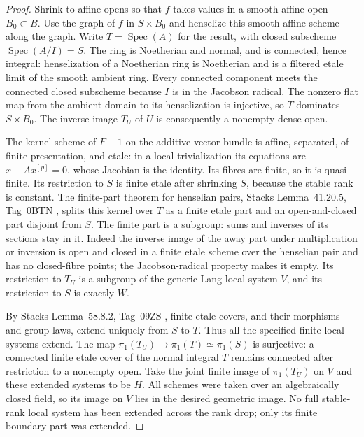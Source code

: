 \begin{proof}
Shrink to affine opens so that $f$ takes values in a smooth
affine open $B_0\subset B$.  Use the graph of $f$ in
$S\times B_0$ and henselize this smooth affine scheme along
the graph.  Write $T=\operatorname{Spec}(A)$ for the result,
with closed subscheme $\operatorname{Spec}(A/I)=S$.
The ring is Noetherian and normal, and is connected, hence integral:
henselization of a Noetherian ring is Noetherian and is a
filtered etale limit of the smooth ambient ring.  Every
connected component meets the connected closed subscheme
because $I$ is in the Jacobson radical.  The nonzero flat
map from the ambient domain to its henselization is injective,
so $T$ dominates $S\times B_0$.  The inverse image $T_U$
of $U$ is consequently a nonempty dense open.

The kernel scheme of $F-1$ on the additive vector bundle
is affine, separated, of finite presentation, and etale:
in a local trivialization its equations are
$x-Ax^{[p]}=0$, whose Jacobian is the identity.
Its fibres are finite, so it is quasi-finite.
Its restriction to $S$ is finite etale after shrinking
$S$, because the stable rank is constant.
The finite-part theorem for henselian pairs,
Stacks Lemma~41.20.5, Tag~0BTN \cite{Stacks0BTN},
splits this kernel over $T$ as a finite etale part and an
open-and-closed part disjoint from $S$.
The finite part is a subgroup: sums and inverses of its
sections stay in it. Indeed the inverse image of the away part
under multiplication or inversion is open and closed in a finite
etale scheme over the henselian pair and has no closed-fibre points;
the Jacobson-radical property makes it empty. Its restriction to
$T_U$ is a subgroup of the generic Lang local system $V$,
and its restriction to $S$ is exactly $W$.

By Stacks Lemma~58.8.2, Tag~09ZS \cite{Stacks09ZS},
finite etale covers, and their morphisms and group laws,
extend uniquely from $S$ to $T$.
Thus all the specified finite local systems extend.
The map $\pi_1(T_U)\to\pi_1(T)\simeq\pi_1(S)$ is
surjective: a connected finite etale cover of the normal
integral $T$ remains connected after restriction to a
nonempty open.  Take the joint finite image of
$\pi_1(T_U)$ on $V$ and these extended systems to be $H$.
All schemes were taken over an algebraically closed field,
so its image on $V$ lies in the desired geometric image.
No full stable-rank local system has been extended across
the rank drop; only its finite boundary part was extended.
\end{proof}

